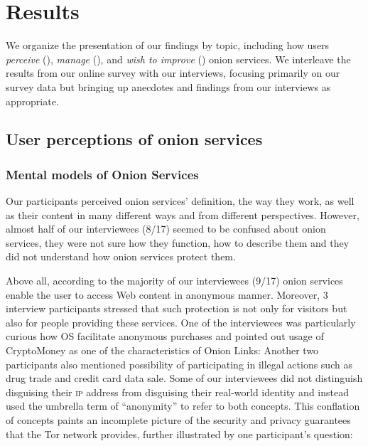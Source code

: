 \section{Results}
\label{sec:results}
We organize the presentation of our findings by topic, including how users
\emph{perceive} (), \emph{manage} (),
and \emph{wish to improve} () onion services.  We interleave the
results from our online survey with our interviews, focusing primarily on our
survey data but bringing up anecdotes and findings from our interviews as
appropriate.

\subsection{User perceptions of onion services}
\label{sec:perception}

\subsubsection{Mental models of Onion Services}


Our participants perceived onion services’ definition, the way they work, as well as their content in many different ways and from different perspectives. However, almost half of our interviewees (8/17) seemed to be confused about onion services, they were not sure how they function, how to describe them and they did not understand how onion services protect them. 

Above all, according to the majority of our interviewees (9/17) onion services enable the user to access Web content in anonymous manner. Moreover, 3 interview participants stressed that such protection is not only for visitors but also for people providing these services. One of the interviewees was particularly curious how OS facilitate anonymous purchases and pointed out usage of CryptoMoney as one of the characteristics of Onion Links:  Another two participants also mentioned possibility of participating in illegal actions such as drug trade and credit card data sale. Some of our interviewees did not distinguish disguising their \textsc{ip}  address from disguising their real-world identity and instead used the umbrella term of “anonymity” to refer
to both concepts. This conflation of concepts paints
an incomplete picture of the security and privacy guarantees
that the Tor network provides, further illustrated
by one participant’s question: 

